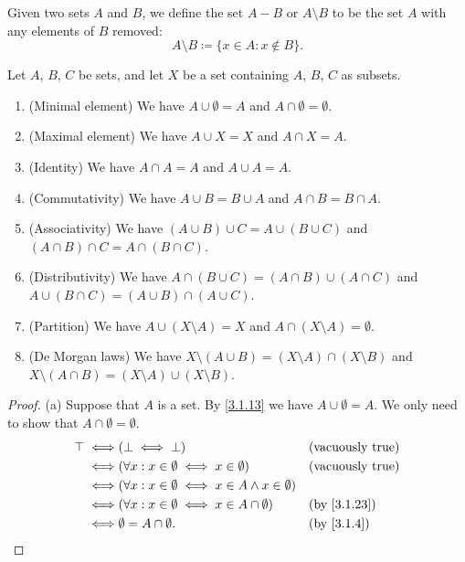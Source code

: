 \setcounter{thm}{26}
\begin{defn}\label{3.1.27}
  Given two sets \(A\) and \(B\), we define the set \(A - B\) or \(A \setminus B\) to be the set \(A\) with any elements of \(B\) removed:
  \[
    A \setminus B \coloneqq \{x \in A : x \notin B\}.
  \]
\end{defn}

\begin{prop}\label{3.1.28}
  Let \(A\), \(B\), \(C\) be sets, and let \(X\) be a set containing \(A\), \(B\), \(C\) as subsets.
  \begin{enumerate}
    \item (Minimal element) We have \(A \cup \emptyset = A\) and \(A \cap \emptyset = \emptyset\).
    \item (Maximal element) We have \(A \cup X = X\) and \(A \cap X = A\).
    \item (Identity) We have \(A \cap A = A\) and \(A \cup A = A\).
    \item (Commutativity) We have \(A \cup B = B \cup A\) and \(A \cap B = B \cap A\).
    \item (Associativity) We have \((A \cup B) \cup C = A \cup (B \cup C)\) and \((A \cap B) \cap C = A \cap (B \cap C)\).
    \item (Distributivity) We have \(A \cap (B \cup C) = (A \cap B) \cup (A \cap C)\) and \(A \cup (B \cap C) = (A \cup B) \cap (A \cup C)\).
    \item (Partition) We have \(A \cup (X \setminus A) = X\) and \(A \cap (X \setminus A) = \emptyset\).
    \item (De Morgan laws) We have \(X \setminus (A \cup B) = (X \setminus A) \cap (X \setminus B)\) and \(X \setminus (A \cap B) = (X \setminus A) \cup (X \setminus B)\).
  \end{enumerate}
\end{prop}

\begin{proof}{(a)}
  Suppose that \(A\) is a set.
  By \cref{3.1.13} we have \(A \cup \emptyset = A\).
  We only need to show that \(A \cap \emptyset = \emptyset\).
  \begin{align*}
    \top \iff & (\bot \iff \bot)                                                 &  & \text{(vacuously true)}   \\
    \iff      & (\forall x : x \in \emptyset \iff x \in \emptyset)               &  & \text{(vacuously true)}   \\
    \iff      & (\forall x : x \in \emptyset \iff x \in A \land x \in \emptyset)                                \\
    \iff      & (\forall x : x \in \emptyset \iff x \in A \cap \emptyset)        &  & \text{(by \cref{3.1.23})} \\
    \iff      & \emptyset = A \cap \emptyset.                                    &  & \by{3.1.4}
  \end{align*}
\end{proof}

